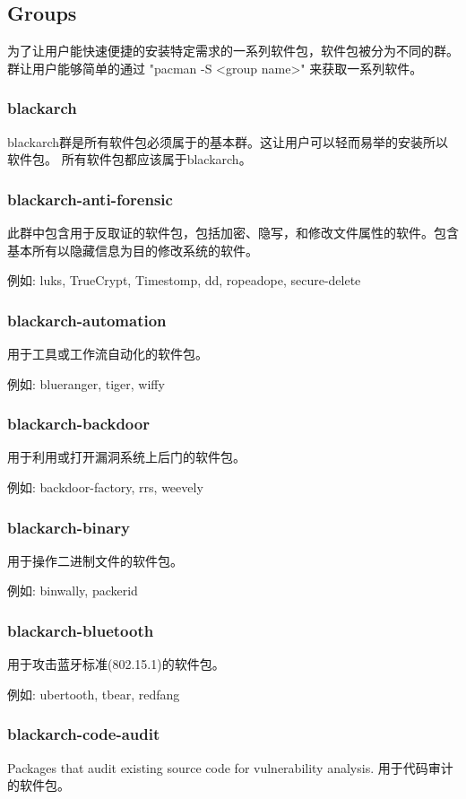 \documentclass[a4paper, oneside, 11pt]{book}
\begin{document}
\subsection{Groups}
为了让用户能快速便捷的安装特定需求的一系列软件包，软件包被分为不同的群。群让用户能够简单的通过 "pacman -S <group name>" 来获取一系列软件。
\subsubsection{blackarch}
blackarch群是所有软件包必须属于的基本群。这让用户可以轻而易举的安装所以软件包。
所有软件包都应该属于blackarch。

\subsubsection{blackarch-anti-forensic}
此群中包含用于反取证的软件包，包括加密、隐写，和修改文件属性的软件。包含基本所有以隐藏信息为目的修改系统的软件。

例如: luks, TrueCrypt, Timestomp, dd, ropeadope, secure-delete
\subsubsection{blackarch-automation}
用于工具或工作流自动化的软件包。

例如: blueranger, tiger, wiffy

\subsubsection{blackarch-backdoor}
用于利用或打开漏洞系统上后门的软件包。

例如: backdoor-factory, rrs, weevely

\subsubsection{blackarch-binary}
用于操作二进制文件的软件包。

例如: binwally, packerid

\subsubsection{blackarch-bluetooth}
用于攻击蓝牙标准(802.15.1)的软件包。

例如: ubertooth, tbear, redfang

\subsubsection{blackarch-code-audit}
Packages that audit existing source code for vulnerability analysis.
用于代码审计的软件包。
\end{document}
